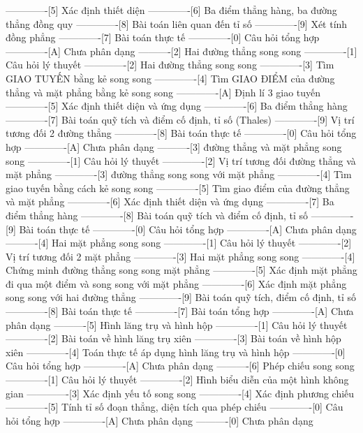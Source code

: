 -------------[5] Xác định thiết diện
-------------[6] Ba điểm thẳng hàng, ba đường thẳng đồng quy
-------------[8] Bài toán liên quan đến tỉ số
-------------[9] Xét tính đồng phẳng
-------------[7] Bài toán thực tế
-------------[0] Câu hỏi tổng hợp
-------------[A] Chưa phân dạng
----------[2] Hai đường thẳng song song
-------------[1] Câu hỏi lý thuyết
-------------[2] Hai đường thẳng song song
-------------[3] Tìm GIAO TUYẾN bằng kẻ song song
-------------[4] Tìm GIAO ĐIỂM của đường thẳng và mặt phẳng bằng kẻ song song
-------------[A] Định lí 3 giao tuyến
-------------[5] Xác định thiết diện và ứng dụng
-------------[6] Ba điểm thẳng hàng
-------------[7] Bài toán quỹ tích và điểm cố định, tỉ số (Thales)
-------------[9] Vị trí tương đối 2 đường thẳng
-------------[8] Bài toán thực tế
-------------[0] Câu hỏi tổng hợp
-------------[A] Chưa phân dạng
----------[3] đường thẳng và mặt phẳng song song
-------------[1] Câu hỏi lý thuyết
-------------[2] Vị trí tương đối đường thẳng và mặt phẳng
-------------[3] đường thẳng song song với mặt phẳng
-------------[4] Tìm giao tuyến bằng cách kẻ song song
-------------[5] Tìm giao điểm của đường thẳng và mặt phẳng
-------------[6] Xác định thiết diện và ứng dụng
-------------[7] Ba điểm thẳng hàng
-------------[8] Bài toán quỹ tích và điểm cố định, tỉ số
-------------[9] Bài toán thực tế
-------------[0] Câu hỏi tổng hợp
-------------[A] Chưa phân dạng
----------[4] Hai mặt phẳng song song
-------------[1] Câu hỏi lý thuyết
-------------[2] Vị trí tương đối 2 mặt phẳng
-------------[3] Hai mặt phẳng song song
-------------[4] Chứng minh đường thẳng song song mặt phẳng
-------------[5] Xác định mặt phẳng đi qua một điểm và song song với mặt phẳng
-------------[6] Xác định mặt phẳng song song với hai đường thẳng
-------------[9] Bài toán quỹ tích, điểm cố định, tỉ số 
-------------[8] Bài toán thực tế
-------------[7] Bài toán tổng hợp
-------------[A] Chưa phân dạng
----------[5] Hình lăng trụ và hình hộp
-------------[1] Câu hỏi lý thuyết
-------------[2] Bài toán về hình lăng trụ xiên
-------------[3] Bài toán về hình hộp xiên
-------------[4] Toán thực tế áp dụng hình lăng trụ và hình hộp
-------------[0] Câu hỏi tổng hợp
-------------[A] Chưa phân dạng
----------[6] Phép chiếu song song
-------------[1] Câu hỏi lý thuyết
-------------[2] Hình biểu diễn của một hình không gian
-------------[3] Xác định yếu tố song song
-------------[4] Xác định phương chiếu
-------------[5] Tính tỉ số đoạn thẳng, diện tích qua phép chiếu
-------------[0] Câu hỏi tổng hợp
-------------[A] Chưa phân dạng
----------[0] Chưa phân dạng
